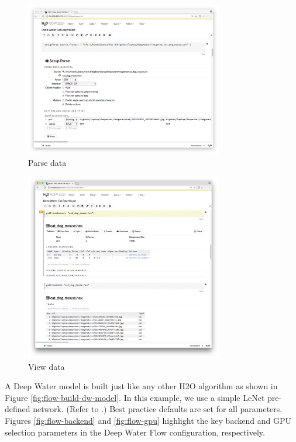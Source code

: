 	\newpage
	\begin{figure}[H]
	\begin{center}
		\includegraphics[width=0.77\textwidth]{images/flow-parse-data.png}
		\caption{Parse data}\label{fig:flow-parse-data}
	\end{center}
	\end{figure}
	
	\begin{figure}[H]
	\begin{center}
		\includegraphics[width=0.77\textwidth]{images/flow-view-data.png}
		\caption{View data}\label{fig:flow-view-data}
	\end{center}
	\end{figure}
	
	\newpage
	A Deep Water model is built just like any other H2O algorithm as shown in Figure \ref{fig:flow-build-dw-model}.  In this example, we use a simple LeNet  pre-defined network. (Refer to \textit{} \cite{lenet}.) Best practice defaults are set for all parameters.  Figures \ref{fig:flow-backend} and \ref{fig:flow-gpu} highlight the key backend and GPU selection parameters in the Deep Water Flow configuration, respectively.
	
